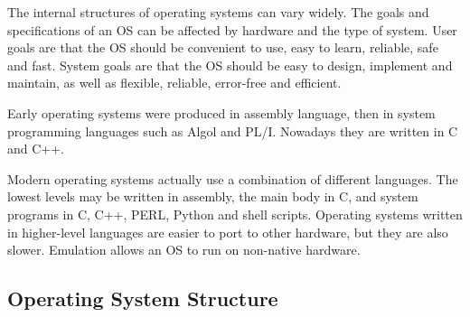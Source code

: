 The internal structures of operating systems can vary widely.
The goals and specifications of an OS can be affected by hardware and the type of system.
User goals are that the OS should be convenient to use, easy to learn, reliable, safe and fast.
System goals are that the OS should be easy to design, implement and maintain, as well as flexible, reliable, error-free and efficient.

Early operating systems were produced in assembly language, then in system programming languages such as Algol and PL/I\@.
Nowadays they are written in C and C++.

Modern operating systems actually use a combination of different languages.
The lowest levels may be written in assembly, the main body in C, and system programs in C, C++, PERL, Python and shell scripts.
Operating systems written in higher-level languages are easier to port to other hardware, but they are also slower.
Emulation allows an OS to run on non-native hardware.

\subsection{Operating System Structure}

